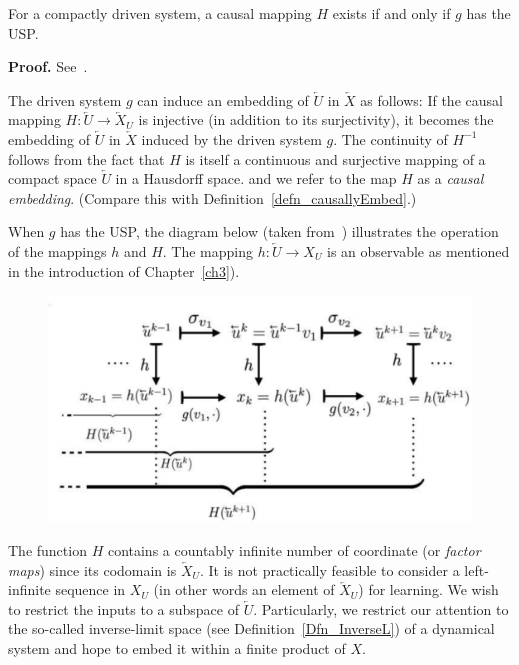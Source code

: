  \begin{Theorem}
  For a compactly driven system, a causal mapping $H$ exists if and only if $g$ has the USP. 
\end{Theorem}
\vspace{-6mm}
{\bf Proof.}  See~\cite[Theorem.3]{manjunath2013echo}.

The driven system $g$ can induce an embedding of $\overleftarrow{U}$ in $\overleftarrow{X}$ as follows: 
If the causal mapping $H:\overleftarrow{U}{\to}{\overleftarrow{X}_U}$ is injective (in addition to its surjectivity), it becomes the embedding of $\overleftarrow{U}$ in $\overleftarrow{X}$ induced by the driven system $g$. 
The continuity of $H^{-1}$ follows from the fact that $H$ is itself a continuous and surjective mapping of a compact space $\overleftarrow{U}$ in a Hausdorff space.
and we refer to the map $H$ as a \emph{causal embedding}. (Compare this with Definition~\ref{defn_causallyEmbed}.) 

When $g$ has the USP, the diagram below (taken from~\cite{Manju_Nonlinearity}) illustrates the operation of the mappings $h$ and $H$. 
The mapping $h:\overleftarrow{U}\to{X_U}$ is an observable as mentioned in the introduction of Chapter~\ref{ch3}).  

\begin{figure}[ht]
  \includegraphics[width=0.6\linewidth]{Graphs/_actionofh_H.eps}
  \centering
\label{fig:actionh_H}
\end{figure}

The function $H$ contains a countably infinite number of coordinate (or \textit{factor maps}) since its codomain is $\overleftarrow{X}_U$.  
It is not practically feasible to consider a left-infinite sequence in $X_U$ (in other words an element of  $\overleftarrow{X}_U$) for learning. We wish to restrict the inputs to a subspace of $\overleftarrow{U}$. 
Particularly, we restrict our attention to the  so-called inverse-limit space (see Definition~\ref{Dfn_InverseL}) of a dynamical system and hope to embed it within a finite product of $X$. 

